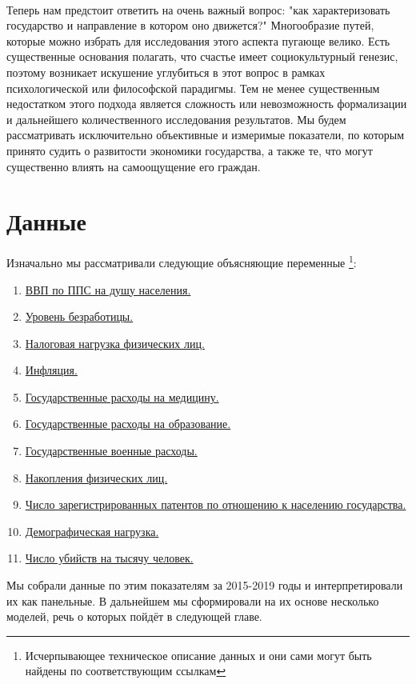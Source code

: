 \documentclass[russian]{vegareport}
\begin{document}
        \\
        Теперь нам предстоит ответить на очень важный вопрос: "как характеризовать государство и направление в котором оно движется?" Многообразие путей, которые можно избрать для исследования этого аспекта пугающе велико. Есть существенные основания полагать, что счастье имеет социокультурный генезис, поэтому возникает искушение углубиться в этот вопрос в рамках психологической или философской парадигмы. Тем не менее существенным недостатком этого подхода является сложность или невозможность формализации и дальнейшего количественного исследования результатов. Мы будем рассматривать исключительно объективные и измеримые показатели, по которым принято судить о развитости экономики государства, а также те, что могут существенно влиять на самоощущение его граждан.

        \section{Данные}
        Изначально мы рассматривали следующие объясняющие переменные \footnote{Исчерпывающее техническое описание данных и они сами могут быть найдены по соответствующим ссылкам}:
        \begin{enumerate} \label{table}
        \item \href{https://data.worldbank.org/indicator/NY.GDP.PCAP.PP.CD}{ВВП по ППС на душу населения.}
        \item \href{https://data.worldbank.org/indicator/GB.XPD.RSDV.GD.ZS?view=chart}{Уровень безработицы.}
        \item \href{https://data.worldbank.org/indicator/IC.TAX.TOTL.CP.ZS?view=chart}{Налоговая нагрузка физических лиц.}
        \item \href{https://data.worldbank.org/indicator/FP.CPI.TOTL.ZG?view=chart}{Инфляция.}
        \item \href{https://data.worldbank.org/indicator/SH.XPD.CHEX.GD.ZS}{Государственные расходы на медицину.}
        \item \href{https://data.worldbank.org/indicator/SE.XPD.TOTL.GD.ZS?view=chart }{Государственные расходы на образование.}
        \item \href{https://data.worldbank.org/indicator/MS.MIL.XPND.GD.ZS}{Государственные военные расходы.}
        \item \href{https://data.worldbank.org/indicator/NY.GNS.ICTR.ZS?view=chart}{Накопления физических лиц.}
        \item \href{https://data.worldbank.org/indicator/IP.PAT.RESD?view=chart}{Число зарегистрированных патентов по отношению к населению государства.}
        \item \href{https://data.worldbank.org/indicator/SP.POP.DPND}{Демографическая нагрузка.}
        \item \href{https://data.worldbank.org/indicator/VC.IHR.PSRC.P5}{Число убийств на тысячу человек.}
        \end{enumerate}
        Мы собрали данные по этим показателям за 2015-2019 годы и интерпретировали их как панельные. В дальнейшем мы сформировали на их основе несколько моделей, речь о которых пойдёт в следующей главе.
\end{document}
